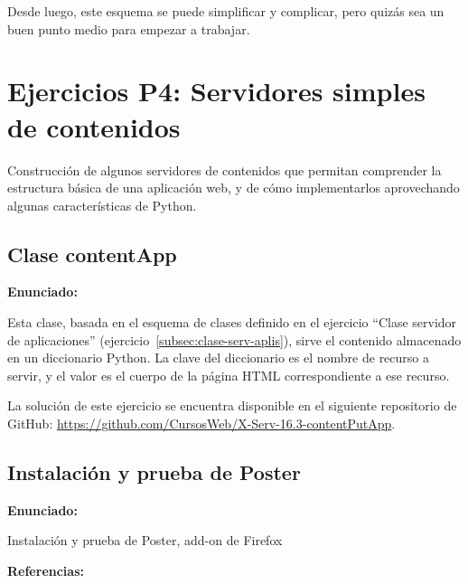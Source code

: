 Desde luego, este esquema se puede simplificar y complicar, pero quizás sea un buen punto medio para empezar a trabajar.

\section{Ejercicios P4: Servidores simples de contenidos}

Construcción de algunos servidores de contenidos que permitan comprender la estructura básica de una aplicación web, y de cómo implementarlos aprovechando algunas características de Python.

\subsection{Clase contentApp}
\label{subsec:contentapp}

\textbf{Enunciado:}

Esta clase, basada en el esquema de clases definido en el ejercicio ``Clase servidor de aplicaciones'' (ejercicio~\ref{subsec:clase-serv-aplis}), sirve el contenido almacenado en un diccionario Python. La clave del diccionario es el nombre de recurso a servir, y el valor es el cuerpo de la página HTML correspondiente a ese recurso.

La solución de este ejercicio se encuentra disponible en el siguiente repositorio de GitHub:
\url{https://github.com/CursosWeb/X-Serv-16.3-contentPutApp}.

\subsection{Instalación y prueba de Poster}
\label{subsec:inst-poster}

\textbf{Enunciado:}

Instalación y prueba de Poster, add-on de Firefox

\textbf{Referencias:}

